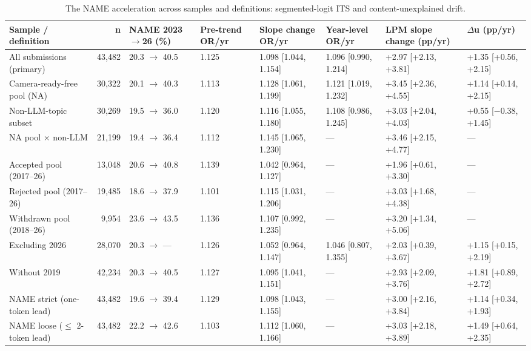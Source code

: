 \begin{table}[t]
\centering
\scriptsize
\caption{The NAME acceleration across samples and definitions: segmented-logit ITS and content-unexplained drift.}
\label{tab:acceleration}
\begin{tabular}{l r l l l l l l}
\toprule
Sample / definition & n & NAME 2023$\rightarrow$26 (\%) & Pre-trend OR/yr & Slope change OR/yr & Year-level OR/yr & LPM slope change (pp/yr) & $\Delta$u (pp/yr) \\
\midrule
All submissions (primary) & 43,482 & 20.3 $\rightarrow$ 40.5 & 1.125 & 1.098 [1.044, 1.154] & 1.096 [0.990, 1.214] & +2.97 [+2.13, +3.81] & +1.35 [+0.56, +2.15] \\
Camera-ready-free pool (NA) & 30,322 & 20.1 $\rightarrow$ 40.3 & 1.113 & 1.128 [1.061, 1.199] & 1.121 [1.019, 1.232] & +3.45 [+2.36, +4.55] & +1.14 [+0.14, +2.15] \\
Non-LLM-topic subset & 30,269 & 19.5 $\rightarrow$ 36.0 & 1.120 & 1.116 [1.055, 1.180] & 1.108 [0.986, 1.245] & +3.03 [+2.04, +4.03] & +0.55 [$-$0.38, +1.45] \\
NA pool $\times$ non-LLM & 21,199 & 19.4 $\rightarrow$ 36.4 & 1.112 & 1.145 [1.065, 1.230] & --- & +3.46 [+2.15, +4.77] & --- \\
Accepted pool (2017--26) & 13,048 & 20.6 $\rightarrow$ 40.8 & 1.139 & 1.042 [0.964, 1.127] & --- & +1.96 [+0.61, +3.30] & --- \\
Rejected pool (2017--26) & 19,485 & 18.6 $\rightarrow$ 37.9 & 1.101 & 1.115 [1.031, 1.206] & --- & +3.03 [+1.68, +4.38] & --- \\
Withdrawn pool (2018--26) & 9,954 & 23.6 $\rightarrow$ 43.5 & 1.136 & 1.107 [0.992, 1.235] & --- & +3.20 [+1.34, +5.06] & --- \\
Excluding 2026 & 28,070 & 20.3 $\rightarrow$ --- & 1.126 & 1.052 [0.964, 1.147] & 1.046 [0.807, 1.355] & +2.03 [+0.39, +3.67] & +1.15 [+0.15, +2.19] \\
Without 2019 & 42,234 & 20.3 $\rightarrow$ 40.5 & 1.127 & 1.095 [1.041, 1.151] & --- & +2.93 [+2.09, +3.76] & +1.81 [+0.89, +2.72] \\
NAME strict (one-token lead) & 43,482 & 19.6 $\rightarrow$ 39.4 & 1.129 & 1.098 [1.043, 1.155] & --- & +3.00 [+2.16, +3.84] & +1.14 [+0.34, +1.93] \\
NAME loose ($\leq$ 2-token lead) & 43,482 & 22.2 $\rightarrow$ 42.6 & 1.103 & 1.112 [1.060, 1.166] & --- & +3.03 [+2.18, +3.89] & +1.49 [+0.64, +2.35] \\

\end{tabular}
\end{table}
